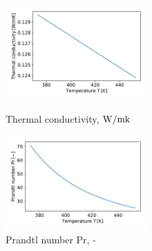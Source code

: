 \documentclass[conference]{IEEEtran}
\begin{document}
\begin{figure}[h]
\begin{minipage}{0.48\linewidth}
 \includegraphics[width=0.48\textwidth,natwidth=190,natheight=210]{fig/thermal_conductivity.pdf}
 \vspace{-1.5zh}
 \caption{Thermal conductivity, $\rm W / m k$}\label{thermal_conductivity}
\end{minipage}
\hfill
\begin{minipage}{0.48\linewidth}
 \includegraphics[width=0.48\textwidth,natwidth=190,natheight=210]{fig/prandtl_number.pdf}
 \vspace{-1.5zh}
 \caption{Prandtl number Pr, -}\label{prandtl_number}
\end{minipage}
\end{figure}

\end{document}
